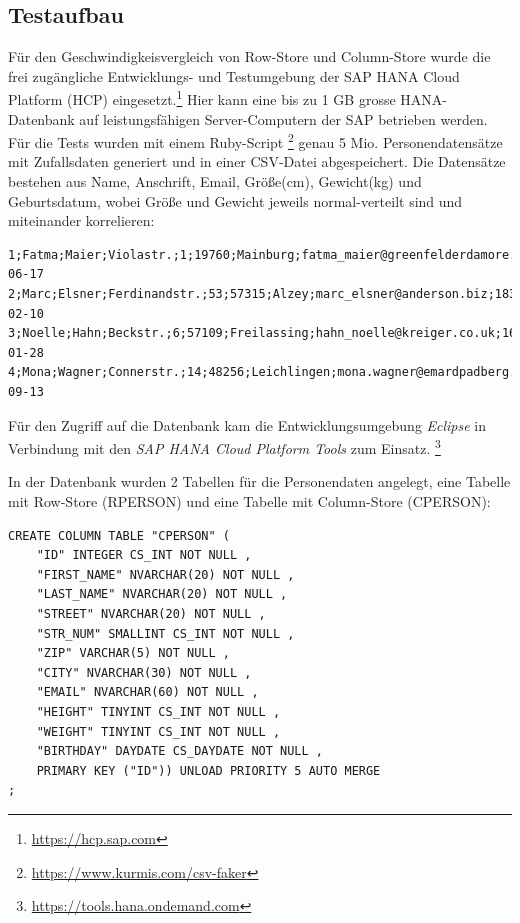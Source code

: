 \subsection{Testaufbau}
Für den Geschwindigkeisvergleich von Row-Store und Column-Store wurde die frei
zugängliche Entwicklungs- und Testumgebung der SAP HANA Cloud Platform (HCP) eingesetzt.\footnote{\url{https://hcp.sap.com}}
Hier kann eine bis zu 1 GB grosse HANA-Datenbank auf leistungsfähigen Server-Computern 
der SAP betrieben werden. 
Für die Tests wurden mit einem Ruby-Script
\footnote{\url{https://www.kurmis.com/csv-faker}}
genau 5 Mio. Personendatensätze mit Zufallsdaten generiert
und in einer CSV-Datei abgespeichert. Die Datensätze bestehen aus Name, Anschrift,
Email, Größe(cm), Gewicht(kg) und Geburtsdatum, wobei Größe und Gewicht jeweils normal-verteilt
sind und miteinander korrelieren:

\begin{scriptsize}
\begin{verbatim}
1;Fatma;Maier;Violastr.;1;19760;Mainburg;fatma_maier@greenfelderdamore.us;155;57;1974-06-17
2;Marc;Elsner;Ferdinandstr.;53;57315;Alzey;marc_elsner@anderson.biz;183;88;1931-02-10
3;Noelle;Hahn;Beckstr.;6;57109;Freilassing;hahn_noelle@kreiger.co.uk;168;44;1982-01-28
4;Mona;Wagner;Connerstr.;14;48256;Leichlingen;mona.wagner@emardpadberg.name;171;73;1942-09-13
\end{verbatim}
\end{scriptsize}

Für den Zugriff auf die Datenbank kam die Entwicklungsumgebung \textit{Eclipse} in Verbindung 
mit den \textit{SAP HANA Cloud Platform Tools} zum Einsatz.
\footnote{\url{https://tools.hana.ondemand.com}}

In der Datenbank wurden 2 Tabellen für die Personendaten angelegt, eine Tabelle 
mit Row-Store (RPERSON) und eine Tabelle mit Column-Store (CPERSON): 

\begin{verbatim}
CREATE COLUMN TABLE "CPERSON" (
    "ID" INTEGER CS_INT NOT NULL ,
    "FIRST_NAME" NVARCHAR(20) NOT NULL ,
    "LAST_NAME" NVARCHAR(20) NOT NULL ,
    "STREET" NVARCHAR(20) NOT NULL ,
    "STR_NUM" SMALLINT CS_INT NOT NULL ,
    "ZIP" VARCHAR(5) NOT NULL ,
    "CITY" NVARCHAR(30) NOT NULL ,
    "EMAIL" NVARCHAR(60) NOT NULL ,
    "HEIGHT" TINYINT CS_INT NOT NULL ,
    "WEIGHT" TINYINT CS_INT NOT NULL ,
    "BIRTHDAY" DAYDATE CS_DAYDATE NOT NULL ,
    PRIMARY KEY ("ID")) UNLOAD PRIORITY 5 AUTO MERGE 
;
\end{verbatim}

